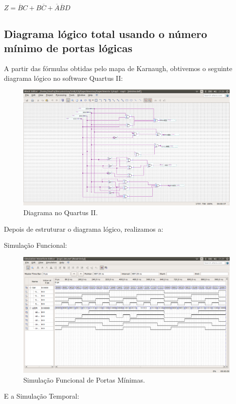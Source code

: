 \documentclass[12pt]{article}
\begin{document}
$ Z = \overline{B}C + B\overline{C} + \overline{A}\overline{B}D$

\subsection{Diagrama lógico total usando o número mínimo de portas lógicas}
\label{sec:minimoporta}

A partir das fórmulas obtidas pelo mapa de Karnaugh, obtivemos o seguinte diagrama lógico no software Quartus II:

\begin{figure}[H]
	\centering
	\includegraphics[width=1\textwidth]{minimo.png}
	\caption{Diagrama no Quartus II.}
	\label{fig:diagrama1}
\end{figure}


Depois de estruturar o diagrama lógico, realizamos a: 

Simulação Funcional:

\begin{figure}[H]
	\centering
	\includegraphics[width=1\textwidth]{funcional1.png}
	\caption{Simulação Funcional de Portas Mínimas.}
	\label{fig:funcional1}
\end{figure}
E a Simulação Temporal:
\end{document}
